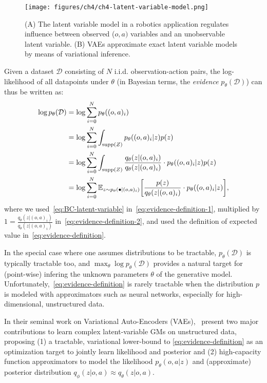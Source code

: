\begin{figure}
    \centering
    \texttt{[image: figures/ch4/ch4-latent-variable-model.png]}
    \caption{(A) The latent variable model in a robotics application regulates influence between observed (\(o,a) \) variables and an unobservable latent variable. (B) VAEs approximate exact latent variable models by means of variational inference. }
    \label{fig:ch4-latent-variable-model}
\end{figure}

Given a dataset \( \mathcal D \) consisting of \( N \) i.i.d. observation-action pairs, the log-likelihood of all datapoints under \( \theta \) (in Bayesian terms, the \emph{evidence} \( p_\theta(\mathcal D)\)) can thus be written as:
\begin{align}
    \log p_\theta(\mathcal D) &= \log \sum_{i=0}^N p_\theta ((o,a)_i) \label{eq:evidence-definition-1}\\
                              &= \log \sum_{i=0}^N \int_{\supp{Z}} p_\theta((o,a)_i \vert z) p(z) \label{eq:evidence-definition-2}\\
                              &= \log \sum_{i=0}^N \int_{\supp{Z}} \frac{q_\theta(z \vert (o,a)_i)}{q_\theta(z \vert (o,a)_i)} \cdot p_\theta((o,a)_i \vert z) p(z) \label{eq:evidence-definition-3}\\
                              &= \log \sum_{i=0}^N \mathbb E_{z \sim p_\theta(\bullet \vert (o,a)_i)} \left[ \frac{p(z)}{q_\theta(z \vert (o,a)_i)} \cdot p_\theta((o,a)_i \vert z) \right], \label{eq:evidence-definition}
\end{align}
where we used~\ref{eq:BC-latent-variable} in~\ref{eq:evidence-definition-1}, multiplied by \(1 = \frac{q_\theta(z \vert (o,a)_i)}{q_\theta(z \vert (o,a)_i)} \) in~\ref{eq:evidence-definition-2}, and used the definition of expected value in~\ref{eq:evidence-definition}.

In the special case where one assumes distributions to be tractable, \( p_\theta (\mathcal D) \) is typically tractable too, and \(\max_\theta \log p_\theta(\mathcal D) \) provides a natural target for (point-wise) infering the unknown parameters \( \theta \) of the generative model.
Unfortunately,~\ref{eq:evidence-definition} is rarely tractable when the distribution \( p \) is modeled with approximators such as neural networks, especially for high-dimensional, unstructured data.

In their seminal work on Variational Auto-Encoders (VAEs),~\citet{kingmaAutoEncodingVariationalBayes2022} present two major contributions to learn complex latent-variable GMs on unstructured data, proposing (1) a tractable, variational lower-bound to \ref{eq:evidence-definition} as an optimization target to jointly learn likelihood and posterior and (2) high-capacity function approximators to model the likelihood \(p_\theta(o,a\vert z)\) and (approximate) posterior distribution \( q_\phi(z \vert o,a) \approx q_\theta(z \vert o,a) \).

